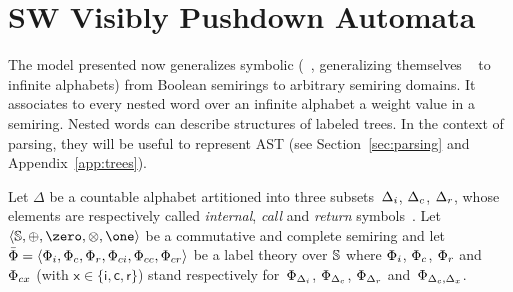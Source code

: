 








\section{SW Visibly Pushdown Automata}
\label{section:SWVPA}\label{sec:SWVPA}
The model presented now generalizes symbolic \VPA
(\SVPA~\cite{dAntonyAlur14SVPDA},
 generalizing themselves \VPA~\cite{AlurMadhusudan09nested} to infinite alphabets)
from Boolean semirings to arbitrary semiring domains.
It associates to every nested word over an infinite alphabet a weight value
in a semiring.
Nested words can describe structures of labeled trees.
In the context of parsing, they will be useful to
represent AST %
(see Section~\ref{sec:parsing} and Appendix~\ref{app:trees}). %

\noindent
\label{sec:SWVPA-def}
Let $\Delta$ be a countable alphabet
artitioned into three
subsets~$\Deltai$, $\Deltac$, $\Deltar$,
whose elements are respectively called
\emph{internal}, \emph{call} and \emph{return} symbols~\cite{AlurMadhusudan09nested}.
Let~$\< \Semiring, \oplus, \zero, \otimes, \one>$ be a commutative and complete semiring and let
$\bar\Phi = \< \Phii, \Phic, \Phir, \Phici, \Phicc, \Phicr>$
be a label theory over $\mathbb{S}$
where $\Phii$, $\Phic$, $\Phir$ and~$\Phicx$ (with $\mathsf{x} \in \{ \mathsf{i}, \mathsf{c}, \mathsf{r}\}$)
stand respectively
for~$\Phi_\Deltai$, $\Phi_\Deltac$, $\Phi_\Deltar$ and~$\Phi_{\Deltac, \Delta_\mathsf{x}}$.
%

